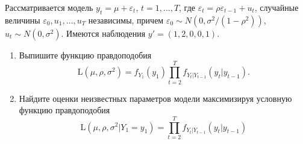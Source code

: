 \documentclass[pdftex,11pt,openany]{book}\usepackage[]{graphicx}\usepackage[]{color}
\begin{document}
\begin{problem}
Рассматривается модель $y_t = \mu + \varepsilon_t$, $t = 1,\ldots,T$, где $\varepsilon_t = \rho \varepsilon_{t-1} + u_t$, случайные величины $\varepsilon_0, u_1,\dots,u_T$ независимы, причем $\varepsilon_0 \sim N(0,\sigma^2/(1 - \rho^2))$, $u_t \sim N(0,\sigma^2)$. Имеются наблюдения $y' = (1, 2, 0, 0, 1)$.
\begin{enumerate}
  \item Выпишите функцию правдоподобия 
  \[
  \mathrm{L}(\mu, \rho, \sigma^2) = f_{Y_1}(y_1)\prod_{t=2}^{T}f_{Y_t|Y_{t-1}}(y_t|y_{t-1}).
  \]
  \item Найдите оценки неизвестных параметров модели максимизируя условную функцию правдоподобия 
  \[
  \mathrm{L}(\mu, \rho, \sigma^2|Y_1 = y_1) = \prod_{t=2}^{T}f_{Y_t|Y_{t-1}}(y_t|y_{t-1})
  \] 
\end{enumerate}
\end{problem}
\end{document}
